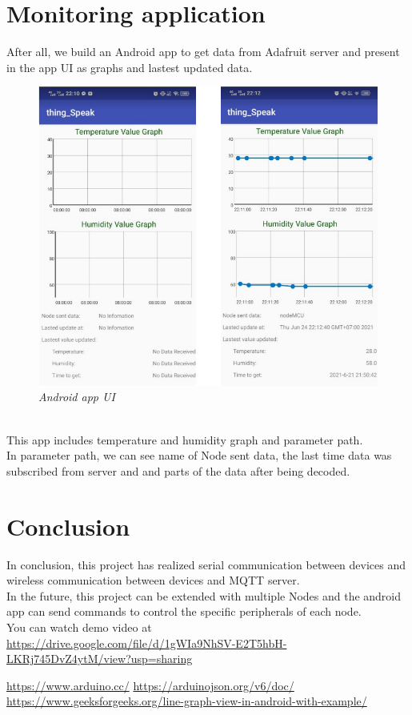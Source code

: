 \documentclass[13pt,a4paper]{article}
\begin{document}
	\section{Monitoring application}
	After all, we build an Android app to get data from Adafruit server and present in the app UI as graphs and lastest updated data.
	\begin{figure}[h!]
		\begin{center}
			\includegraphics[width=15cm]{app.png}
			\caption{\textit{Android app UI}}
		\end{center}
	\end{figure}
	\\ 
	This app includes temperature and humidity graph and parameter path. \\
	In parameter path, we can see name of Node sent data, the last time data was subscribed from server and and parts of the data after being decoded. 
	
	\newpage
	\section{Conclusion}
	In conclusion, this project has realized serial communication between devices and wireless communication between devices and MQTT server.\\
	In the future, this project can be extended with multiple Nodes and the android app can send commands to control the specific peripherals of each node.\\
	You can watch demo video at \\ \url{https://drive.google.com/file/d/1gWIa9NhSV-E2T5hbH-LKRj745DvZ4ytM/view?usp=sharing}
	
	\newpage
	\begin{thebibliography}{99999}	
		 {\url{https://www.arduino.cc/}}
		 {\url{https://arduinojson.org/v6/doc/}}
		 {\url{https://www.geeksforgeeks.org/line-graph-view-in-android-with-example/}}
		
	\end{thebibliography}
\end{document}
